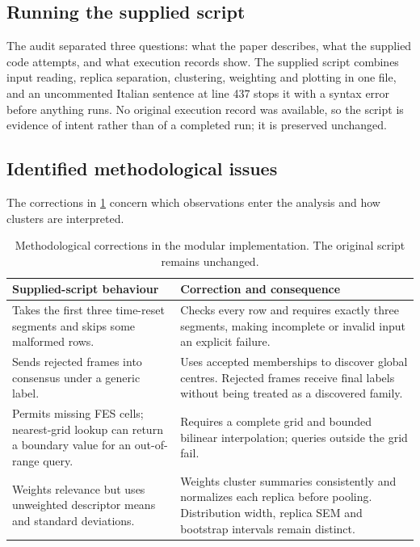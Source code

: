 \subsection{Running the supplied script}
The audit separated three questions: what the paper describes, what the supplied code attempts, and what execution records show. The supplied script combines input reading, replica separation, clustering, weighting and plotting in one file, and an uncommented Italian sentence at line 437 stops it with a syntax error before anything runs. No original execution record was available, so the script is evidence of intent rather than of a completed run; it is preserved unchanged.

\subsection{Identified methodological issues}
The corrections in \cref{tab:auditcorrections} concern which observations enter the analysis and how clusters are interpreted.

\begin{table}[htbp]
\centering
\caption{Methodological corrections in the modular implementation. The original script remains unchanged.}
\label{tab:auditcorrections}
\begin{tabularx}{\textwidth}{@{}>{\raggedright\arraybackslash}p{}>{\raggedright\arraybackslash}X@{}}
\toprule
Supplied-script behaviour & Correction and consequence\\
\midrule
Takes the first three time-reset segments and skips some malformed rows.
& Checks every row and requires exactly three segments, making incomplete or invalid input an explicit failure.\\
\addlinespace
Sends rejected frames into consensus under a generic label.
& Uses accepted memberships to discover global centres. Rejected frames receive final labels without being treated as a discovered family.\\
\addlinespace
Permits missing FES cells; nearest-grid lookup can return a boundary value for an out-of-range query.
& Requires a complete grid and bounded bilinear interpolation; queries outside the grid fail.\\
\addlinespace
Weights relevance but uses unweighted descriptor means and standard deviations.
& Weights cluster summaries consistently and normalizes each replica before pooling. Distribution width, replica SEM and bootstrap intervals remain distinct.\\
\bottomrule
\end{tabularx}
\end{table}

